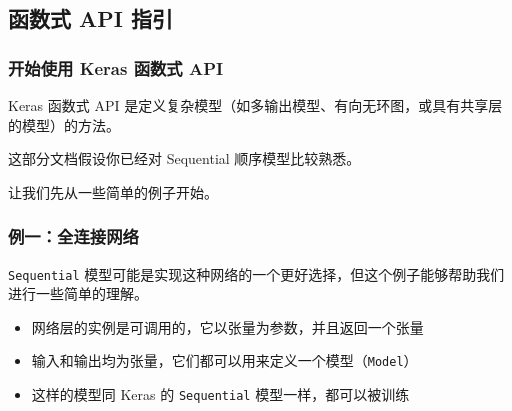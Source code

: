 \subsection{函数式 API 指引}
\subsubsection{开始使用 Keras 函数式 API}\label{functional-api-guide}

Keras 函数式 API
是定义复杂模型（如多输出模型、有向无环图，或具有共享层的模型）的方法。

这部分文档假设你已经对 Sequential 顺序模型比较熟悉。

让我们先从一些简单的例子开始。


\subsubsection{例一：全连接网络}\label{ux4f8bux4e00ux5168ux8fdeux63a5ux7f51ux7edc}

\texttt{Sequential}
模型可能是实现这种网络的一个更好选择，但这个例子能够帮助我们进行一些简单的理解。

\begin{itemize}
\tightlist
\item
  网络层的实例是可调用的，它以张量为参数，并且返回一个张量
\item
  输入和输出均为张量，它们都可以用来定义一个模型（\texttt{Model}）
\item
  这样的模型同 Keras 的 \texttt{Sequential} 模型一样，都可以被训练
\end{itemize}


